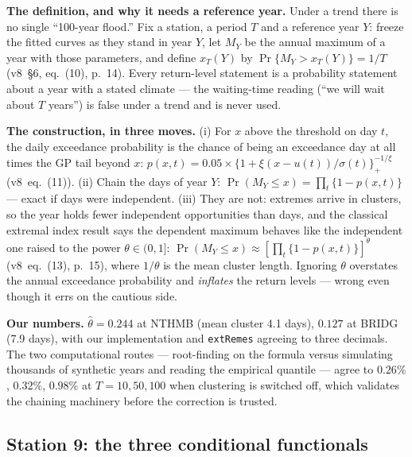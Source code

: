 \documentclass[11pt]{article}
\newcommand{\code}[1]{\texttt{#1}}
\begin{document}
\textbf{The definition, and why it needs a reference year.} Under a trend
there is no single ``100-year flood.'' Fix a station, a period $T$ and a
reference year $Y$: freeze the fitted curves as they stand in year $Y$, let
$M_Y$ be the annual maximum of a year with those parameters, and define
$x_T(Y)$ by $\Pr\{M_Y > x_T(Y)\} = 1/T$ (v8~\S6, eq.~(10), p.~14). Every
return-level statement is a probability statement about a year with a stated
climate --- the waiting-time reading (``we will wait about $T$ years'') is
false under a trend and is never used.

\textbf{The construction, in three moves.} (i) For $x$ above the threshold on
day $t$, the daily exceedance probability is the chance of being an
exceedance day at all times the GP tail beyond $x$:
$p(x,t) = 0.05 \times \{1 + \xi (x - u(t))/\sigma(t)\}_+^{-1/\xi}$
(v8~eq.~(11)). (ii) Chain the days of year $Y$:
$\Pr(M_Y \le x) = \prod_t \{1 - p(x,t)\}$ --- exact if days were
independent. (iii) They are not: extremes arrive in clusters, so the year
holds fewer independent opportunities than days, and the classical extremal
index result says the dependent maximum behaves like the independent one
raised to the power $\theta \in (0,1]$:
$\Pr(M_Y \le x) \approx [\prod_t \{1-p(x,t)\}]^{\theta}$ (v8~eq.~(13),
p.~15), where $1/\theta$ is the mean cluster length. Ignoring $\theta$
overstates the annual exceedance probability and \emph{inflates} the return
levels --- wrong even though it errs on the cautious side.

\textbf{Our numbers.} $\hat\theta = 0.244$ at NTHMB (mean cluster 4.1 days),
$0.127$ at BRIDG (7.9 days), with our implementation and
\code{extRemes} agreeing to three decimals. The two computational routes ---
root-finding on the formula versus simulating thousands of synthetic years
and reading the empirical quantile --- agree to $0.26\%$, $0.32\%$, $0.98\%$
at $T = 10, 50, 100$ when clustering is switched off, which validates the
chaining machinery before the correction is trusted.

\subsection{Station 9: the three conditional functionals}
\label{sec:funcs}
\end{document}
